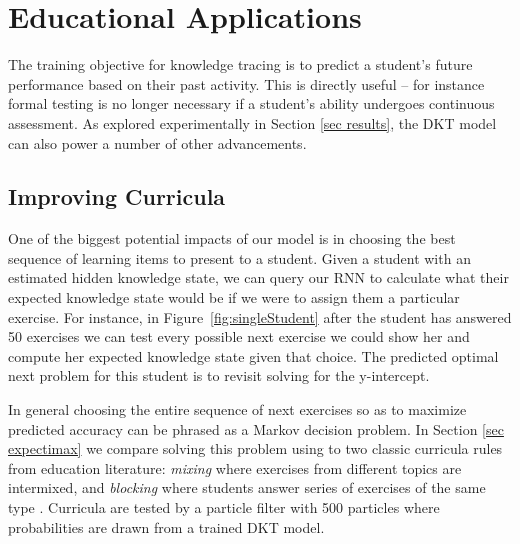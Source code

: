 \documentclass{article} \usepackage{nips,times}
\begin{document}
\section{Educational Applications}

The training objective for knowledge tracing is to predict a student's future performance based on their past activity.
This is directly useful -- for instance formal testing is no longer necessary if a student's ability undergoes continuous assessment.
As explored experimentally in Section \ref{sec results},
the DKT model can also power a number of other advancements.


\subsection{Improving Curricula}

One of the biggest potential impacts of our model is in choosing the best sequence of learning items to present to a student. 
Given a student with an estimated hidden knowledge state, we can query our RNN to calculate what their expected knowledge state would be if we were to assign them a particular exercise.
For instance, in Figure~\ref{fig:singleStudent} after the student has answered 50 exercises we can test every possible next exercise we could show her and compute her expected knowledge state given that choice.
The predicted optimal next problem for this student is to revisit solving for the y-intercept.



In general choosing the entire sequence of next exercises so as to maximize predicted accuracy can be phrased as a Markov decision problem.
In Section \ref{sec expectimax}
we compare solving this problem using  to two classic curricula rules from education literature: {\em mixing} where exercises from different topics are intermixed, and {\em blocking} where students answer series of exercises of the same type \cite{rohrer2009effects}. Curricula are tested by a particle filter with 500 particles where probabilities are drawn from a trained DKT model. 

 
\end{document}
